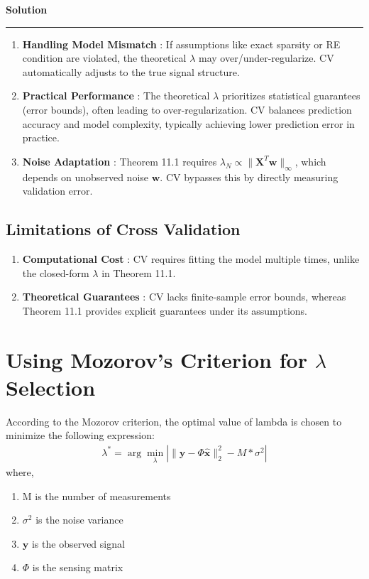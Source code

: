 \documentclass[a4paper,12pt]{article}
\newenvironment{solution}[2][]{%
    \begin{mdframed}[linecolor=blue!70!black, linewidth=2pt, roundcorner=10pt, backgroundcolor=yellow!10!white, skipabove=12pt, skipbelow=12pt]%
        \textbf{\large #2}
        \par\noindent\rule{\textwidth}{0.4pt}
}{
    \end{mdframed}
}
\begin{document}
\begin{solution}{Solution}
\begin{enumerate}
      \item \textbf{Handling Model Mismatch} : If assumptions like exact sparsity or RE condition are violated, the theoretical $\lambda$ may over/under-regularize. CV automatically adjusts to the true signal structure.

      \item \textbf{Practical Performance} : The theoretical $\lambda$ prioritizes statistical guarantees (error bounds), often leading to over-regularization. CV balances prediction accuracy and model complexity, typically achieving lower prediction error in practice.

      \item \textbf{Noise Adaptation} : Theorem 11.1 requires $\lambda_N \propto \|\mathbf{X}^T \mathbf{w}\|_\infty$, which depends on unobserved noise $\mathbf{w}$. CV bypasses this by directly measuring validation error.
  \end{enumerate}

  \subsection{Limitations of Cross Validation}
  \begin{enumerate}
      \item \textbf{Computational Cost} : CV requires fitting the model multiple times, unlike the closed-form $\lambda$ in Theorem 11.1.
      \item \textbf{Theoretical Guarantees} : CV lacks finite-sample error bounds, whereas Theorem 11.1 provides explicit guarantees under its assumptions.
  \end{enumerate}


  \section{Using Mozorov's Criterion for $\lambda$ Selection}
   
  According to the Mozorov criterion, the optimal value of lambda is chosen to minimize the following expression:
  \begin{align*}
    \lambda^* = \arg\min_{\lambda} | \|\mathbf{y} - \Phi \hat{\mathbf{x}}\|_2^2 - M * \sigma^2 |
  \end{align*}
  where,
  \begin{enumerate}
    \item M is the number of measurements
    \item $\sigma^2$ is the noise variance
    \item $\mathbf{y}$ is the observed signal
    \item $\Phi$ is the sensing matrix
  \end{enumerate}


\end{solution}
\end{document}
